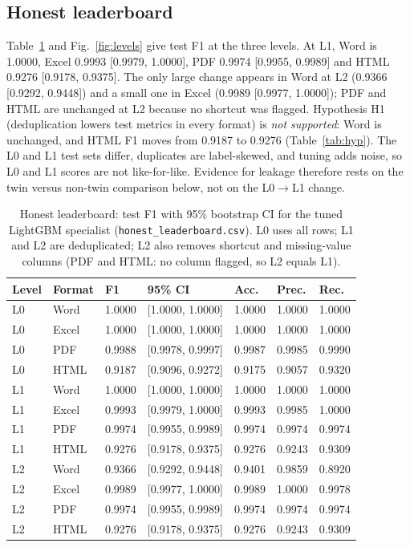 \documentclass[conference]{IEEEtran}
\begin{document}
\subsection{Honest leaderboard}
Table~\ref{tab:lb} and Fig.~\ref{fig:levels} give test F1 at the three levels. At L1, Word is 1.0000, Excel 0.9993 [0.9979, 1.0000], PDF 0.9974 [0.9955, 0.9989] and HTML 0.9276 [0.9178, 0.9375]. The only large change appears in Word at L2 (0.9366 [0.9292, 0.9448]) and a small one in Excel (0.9989 [0.9977, 1.0000]); PDF and HTML are unchanged at L2 because no shortcut was flagged. Hypothesis H1 (deduplication lowers test metrics in every format) is \emph{not supported}: Word is unchanged, and HTML F1 moves from 0.9187 to 0.9276 (Table~\ref{tab:hyp}). The L0 and L1 test sets differ, duplicates are label-skewed, and tuning adds noise, so L0 and L1 scores are not like-for-like. Evidence for leakage therefore rests on the twin versus non-twin comparison below, not on the L0$\to$L1 change.

\begin{table}[t]
\centering\footnotesize
\caption{Honest leaderboard: test F1 with 95\% bootstrap CI for the tuned LightGBM specialist (\texttt{honest\_leaderboard.csv}). L0 uses all rows; L1 and L2 are deduplicated; L2 also removes shortcut and missing-value columns (PDF and HTML: no column flagged, so L2 equals L1).}
\label{tab:lb}
\begin{tabular}{lllllll}
\toprule
Level & Format & F1 & 95\% CI & Acc. & Prec. & Rec. \\
\midrule
L0 & Word & 1.0000 & [1.0000, 1.0000] & 1.0000 & 1.0000 & 1.0000 \\
L0 & Excel & 1.0000 & [1.0000, 1.0000] & 1.0000 & 1.0000 & 1.0000 \\
L0 & PDF & 0.9988 & [0.9978, 0.9997] & 0.9987 & 0.9985 & 0.9990 \\
L0 & HTML & 0.9187 & [0.9096, 0.9272] & 0.9175 & 0.9057 & 0.9320 \\
\midrule
L1 & Word & 1.0000 & [1.0000, 1.0000] & 1.0000 & 1.0000 & 1.0000 \\
L1 & Excel & 0.9993 & [0.9979, 1.0000] & 0.9993 & 0.9985 & 1.0000 \\
L1 & PDF & 0.9974 & [0.9955, 0.9989] & 0.9974 & 0.9974 & 0.9974 \\
L1 & HTML & 0.9276 & [0.9178, 0.9375] & 0.9276 & 0.9243 & 0.9309 \\
\midrule
L2 & Word & 0.9366 & [0.9292, 0.9448] & 0.9401 & 0.9859 & 0.8920 \\
L2 & Excel & 0.9989 & [0.9977, 1.0000] & 0.9989 & 1.0000 & 0.9978 \\
L2 & PDF & 0.9974 & [0.9955, 0.9989] & 0.9974 & 0.9974 & 0.9974 \\
L2 & HTML & 0.9276 & [0.9178, 0.9375] & 0.9276 & 0.9243 & 0.9309 \\
\bottomrule
\end{tabular}
\end{table}
\end{document}
